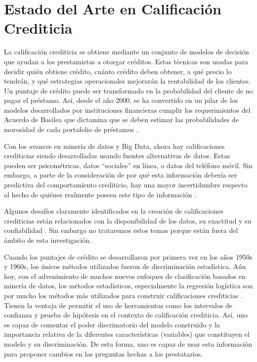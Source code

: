 \chapter{Estado del Arte en Calificación Crediticia}

La calificación crediticia se obtiene mediante un conjunto de modelos de decisión que ayudan a los prestamistas a otorgar créditos. Estas técnicas son usadas para decidir quién obtiene crédito, cuánto crédito deben obtener, a qué precio lo tendrán, y qué estrategias operacionales mejorarán la rentabilidad de los clientes. Un puntaje de crédito puede ser transformado en la probabilidad del cliente de no pagar el préstamo. Así, desde el año 2000, se ha convertido en un pilar de los modelos desarrollados por instituciones financieras cumplir los requerimientos del Acuerdo de Basilea que dictamina que se deben estimar las probabilidades de morosidad de cada portafolio de préstamos \citep[1]{thomas2017credit}.

Con los avances en minería de datos y Big Data, ahora hay calificaciones crediticias siendo desarrolladas usando fuentes alternativas de datos. Estas pueden ser psicométricas, datos ``sociales'' en línea, o datos del teléfono móvil. Sin embargo, a parte de la consideración de por qué esta información debería ser predictiva del comportamiento crediticio, hay una mayor incertidumbre respecto al hecho de quiénes realmente poseen este tipo de información \citep[18]{thomas2017credit}.

Algunos desafíos claramente identificados en la creación de calificaciones crediticias están relacionados con la disponibilidad de los datos, su exactitud y su confiabilidad \citep[18--19]{thomas2017credit}. Sin embargo no trataremos estos temas porque están fuera del ámbito de esta investigación.

Cuando los puntajes de crédito se desarrollaron por primera vez en los años 1950s y 1960s, los únicos métodos utilizados fueron de discriminación estadística. Aún hoy, con el advenimiento de muchos nuevos enfoques de clasificación basados en minería de datos, los métodos estadísticos, especialmente la regresión logística son por mucho los métodos más utilizados para construir calificaciones crediticias \citep[25]{thomas2017credit}. Tienen la ventaja de permitir el uso de herramientas como los intervalos de confianza y prueba de hipótesis en el contexto de calificación crediticia. Así, uno es capaz de comentar el poder discrimatorio del modelo construido y la importancia relativa de la diferentes características (variables) que constituyen el modelo y su discriminación. De esta forma, uno es capaz de usar esta información para proponer cambios en las preguntas hechas a los prestatarios.

